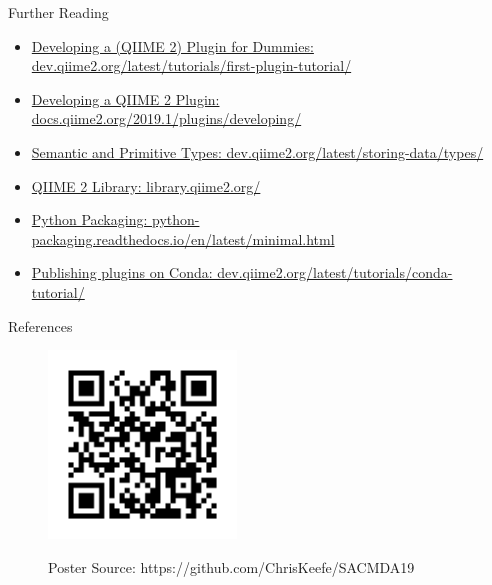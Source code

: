 \documentclass[final]{beamer}
\newlength{\sepwidth}
\newlength{\colwidth}
\newcommand{\separatorcolumn}{\begin{column}{\sepwidth}\end{column}}
\begin{document}
\begin{frame}[t]
\begin{columns}[t]
\begin{column}{\colwidth}
  \begin{block}{Further Reading}
    \begin{itemize}
      \item \href{https://dev.qiime2.org/latest/tutorials/first-plugin-tutorial/}{Developing a (QIIME 2) Plugin for Dummies: dev.qiime2.org/latest/tutorials/first-plugin-tutorial/}
      \item \href{https://docs.qiime2.org/2019.1/plugins/developing/}{Developing a QIIME 2 Plugin: docs.qiime2.org/2019.1/plugins/developing/}
      \item \href{https://dev.qiime2.org/latest/storing-data/types/}{Semantic and Primitive Types: dev.qiime2.org/latest/storing-data/types/}
      \item \href{https://library.qiime2.org/}{QIIME 2 Library: library.qiime2.org/}
      \item \href{https://python-packaging.readthedocs.io/en/latest/minimal.html}{Python Packaging: python-packaging.readthedocs.io/en/latest/minimal.html}
      \item \href{https://dev.qiime2.org/latest/tutorials/conda-tutorial/}{Publishing plugins on Conda: dev.qiime2.org/latest/tutorials/conda-tutorial/}
    \end{itemize}
  \end{block}

  \begin{block}{References}
    \nocite{*}
    
  \end{block}

  \begin{figure}
    \begin{minipage}[c]{\textwidth}
      \hfill
      \includegraphics[height=5cm]{assets/repo}
    \end{minipage}
    \begin{minipage}[c]{\textwidth}
      \hfill
      Poster Source: https://github.com/ChrisKeefe/SACMDA19
    \end{minipage}
  \end{figure}

\end{column}

\separatorcolumn
\end{columns}
\end{frame}
\end{document}
